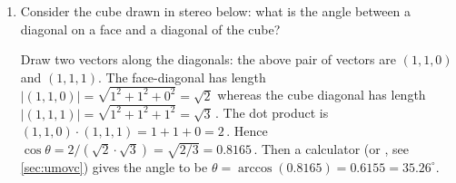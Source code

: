 \begin{example}
\begin{enumerate}
\item Consider the cube drawn in stereo below: what is the angle between a diagonal on a face and a diagonal of the cube?
\begin{center}
 {
}
\end{center}
\begin{solution} 
Draw two vectors along the diagonals: the above pair of vectors are \((1,1,0)\) and \((1,1,1)\).
The face-diagonal has length \(|(1,1,0)|=\sqrt{1^2+1^2+0^2}=\sqrt2\) whereas the cube diagonal has length \(|(1,1,1)|=\sqrt{1^2+1^2+1^2}=\sqrt3\)\,.
The dot product is \((1,1,0)\cdot(1,1,1)=1+1+0=2\)\,.
Hence  \(\cos\theta=2/(\sqrt2\cdot\sqrt3)=\sqrt{2/3}=0.8165\)\,.
Then a calculator (or \script, see \autoref{sec:umovc}) gives the angle to be \(\theta =\arccos(0.8165) =0.6155 =35.26^\circ\).
\end{solution}



\end{enumerate}
\end{example}
